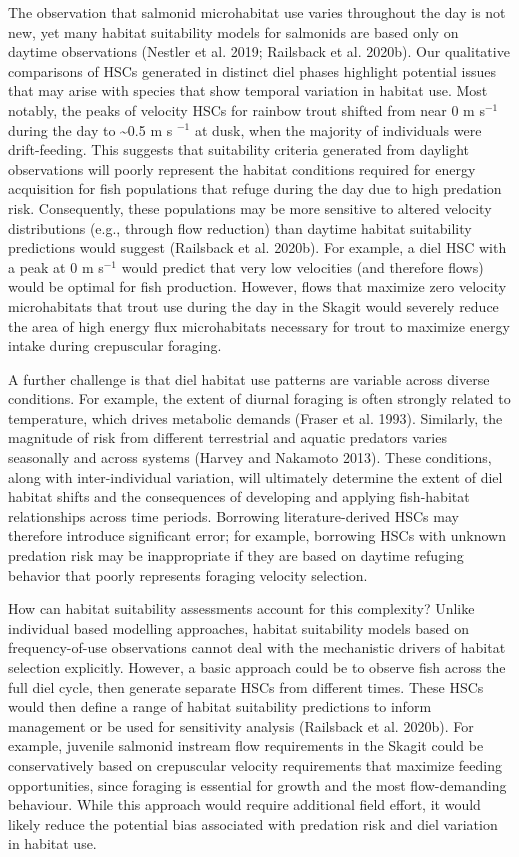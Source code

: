 \documentclass[]{article}
\begin{document}
The observation that salmonid microhabitat use varies throughout the day
is not new, yet many habitat suitability models for salmonids are based
only on daytime observations (Nestler et al. 2019; Railsback et al.
2020b). Our qualitative comparisons of HSCs generated in distinct diel
phases highlight potential issues that may arise with species that show
temporal variation in habitat use. Most notably, the peaks of velocity
HSCs for rainbow trout shifted from near 0 m s\(^{-1}\) during the day
to \textasciitilde{}0.5 m s \(^{-1}\) at dusk, when the majority of
individuals were drift-feeding. This suggests that suitability criteria
generated from daylight observations will poorly represent the habitat
conditions required for energy acquisition for fish populations that
refuge during the day due to high predation risk. Consequently, these
populations may be more sensitive to altered velocity distributions
(e.g., through flow reduction) than daytime habitat suitability
predictions would suggest (Railsback et al. 2020b). For example, a diel
HSC with a peak at 0 m s\(^{-1}\) would predict that very low velocities
(and therefore flows) would be optimal for fish production. However,
flows that maximize zero velocity microhabitats that trout use during
the day in the Skagit would severely reduce the area of high energy flux
microhabitats necessary for trout to maximize energy intake during
crepuscular foraging.

A further challenge is that diel habitat use patterns are variable
across diverse conditions. For example, the extent of diurnal foraging
is often strongly related to temperature, which drives metabolic demands
(Fraser et al. 1993). Similarly, the magnitude of risk from different
terrestrial and aquatic predators varies seasonally and across systems
(Harvey and Nakamoto 2013). These conditions, along with
inter-individual variation, will ultimately determine the extent of diel
habitat shifts and the consequences of developing and applying
fish-habitat relationships across time periods. Borrowing
literature-derived HSCs may therefore introduce significant error; for
example, borrowing HSCs with unknown predation risk may be inappropriate
if they are based on daytime refuging behavior that poorly represents
foraging velocity selection.

How can habitat suitability assessments account for this complexity?
Unlike individual based modelling approaches, habitat suitability models
based on frequency-of-use observations cannot deal with the mechanistic
drivers of habitat selection explicitly. However, a basic approach could
be to observe fish across the full diel cycle, then generate separate
HSCs from different times. These HSCs would then define a range of
habitat suitability predictions to inform management or be used for
sensitivity analysis (Railsback et al. 2020b). For example, juvenile
salmonid instream flow requirements in the Skagit could be
conservatively based on crepuscular velocity requirements that maximize
feeding opportunities, since foraging is essential for growth and the
most flow-demanding behaviour. While this approach would require
additional field effort, it would likely reduce the potential bias
associated with predation risk and diel variation in habitat use.
\end{document}
